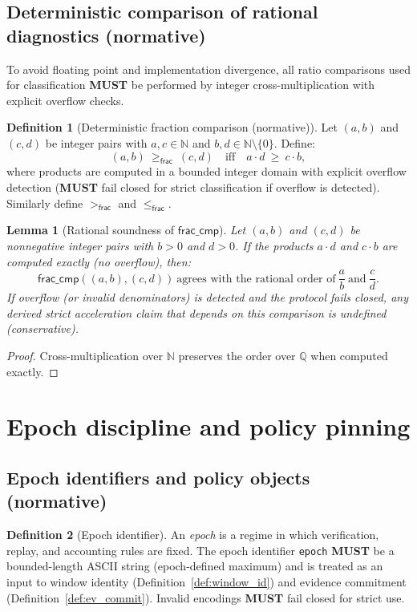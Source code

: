 \documentclass[11pt]{article}
\newcommand{\MUST}{\textbf{MUST}}
\newcommand{\code}[1]{\texttt{#1}}
\newcommand{\term}[1]{\emph{#1}}
\newcommand{\N}{\mathbb{N}}
\newcommand{\1}{\mathbf{1}}
\theoremstyle{definition}
\newtheorem{definition}{Definition}
\theoremstyle{plain}
\newtheorem{lemma}{Lemma}
\begin{document}
\subsection{Deterministic comparison of rational diagnostics (normative)}

To avoid floating point and implementation divergence, all ratio comparisons used for classification \MUST{} be performed by integer cross-multiplication with explicit overflow checks.

\begin{definition}[Deterministic fraction comparison (normative)]
\label{def:frac_cmp}
Let $(a,b)$ and $(c,d)$ be integer pairs with $a,c\in\N$ and $b,d\in\N\setminus\{0\}$. Define:
\[
(a,b)\ \ge_{\textsf{frac}}\ (c,d)\quad \text{iff}\quad a\cdot d\ \ge\ c\cdot b,
\]
where products are computed in a bounded integer domain with explicit overflow detection (\MUST{} fail closed for strict classification if overflow is detected).
Similarly define $>_{\textsf{frac}}$ and $\le_{\textsf{frac}}$.
\end{definition}

\begin{lemma}[Rational soundness of \texorpdfstring{$\mathsf{frac\_cmp}$}{frac comparison}]
\label{lem:frac_cmp_sound}
Let $(a,b)$ and $(c,d)$ be nonnegative integer pairs with $b>0$ and $d>0$.
If the products $a\cdot d$ and $c\cdot b$ are computed exactly (no overflow), then:
\[
\mathsf{frac\_cmp}((a,b),(c,d))\ \text{agrees with the rational order of}\ \frac{a}{b}\ \text{and}\ \frac{c}{d}.
\]
If overflow (or invalid denominators) is detected and the protocol fails closed, any derived strict acceleration claim that depends on this comparison is undefined (conservative).
\end{lemma}
\begin{proof}
Cross-multiplication over $\mathbb{N}$ preserves the order over $\mathbb{Q}$ when computed exactly.
\end{proof}


\section{Epoch discipline and policy pinning}
\label{sec:epoch}

\subsection{Epoch identifiers and policy objects (normative)}

\begin{definition}[Epoch identifier]
\label{def:epoch_id}
An \term{epoch} is a regime in which verification, replay, and accounting rules are fixed. The epoch identifier \code{epoch} \MUST{} be a bounded-length ASCII string (epoch-defined maximum) and is treated as an input to window identity (Definition~\ref{def:window_id}) and evidence commitment (Definition~\ref{def:ev_commit}). Invalid encodings \MUST{} fail closed for strict use.
\end{definition}
\end{document}

